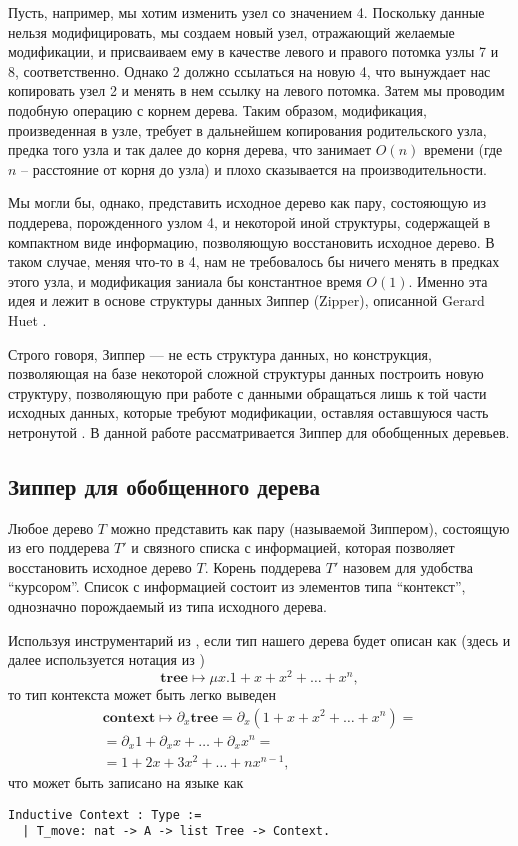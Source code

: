 Пусть, например, мы хотим изменить узел со значением 4. Поскольку данные нельзя модифицировать, мы создаем новый узел, отражающий желаемые модификации, и присваиваем ему в качестве левого и правого потомка узлы 7 и 8, соответственно. Однако 2 должно ссылаться на новую 4, что вынуждает нас копировать узел 2 и менять в нем ссылку на левого потомка. Затем мы проводим подобную операцию с корнем дерева. Таким образом, модификация, произведенная в узле, требует в дальнейшем копирования родительского узла, предка того узла и так далее до корня дерева, что занимает $O(n)$ времени (где $n$ -- расстояние от корня до узла) и плохо сказывается на производительности.

Мы могли бы, однако, представить исходное дерево как пару, состояющую из поддерева, порожденного узлом 4, и некоторой иной структуры, содержащей в компактном виде информацию, позволяющую восстановить исходное дерево. В таком случае, меняя что-то в 4, нам не требовалось бы ничего менять в предках этого узла, и модификация заниала бы константное время $O(1)$. Именно эта идея и лежит в основе структуры данных Зиппер (Zipper), описанной Gerard Huet \autocite{Huet1997}.

Строго говоря, Зиппер --- не есть структура данных, но конструкция, позволяющая на базе некоторой сложной структуры данных построить новую структуру, позволяющую при работе с данными обращаться лишь к той части исходных данных, которые требуют модификации, оставляя оставшуюся часть нетронутой \autocite{Huet1997}. В данной работе рассматривается Зиппер для обобщенных деревьев.

\subsection{Зиппер для обобщенного дерева}

Любое дерево $T$ можно представить как пару (называемой Зиппером), состоящую из его поддерева $T'$ и связного списка с информацией, которая позволяет восстановить исходное дерево $T$. Корень поддерева $T'$ назовем для удобства ``курсором''. Список с информацией состоит из элементов типа ``контекст'', однозначно порождаемый из типа исходного дерева.

Используя инструментарий из \autocite{McBride2009}, если тип нашего дерева будет описан как (здесь и далее используется нотация из \autocite{McBride2009})
\begin{equation*}
\textbf{tree} \mapsto \mu x. 1 + x + x^2 + \dotsc + x^n,
\end{equation*}   
то тип контекста может быть легко выведен
\begin{multline*}
\textbf{context} \mapsto \partial_x \textbf{tree} = \partial_x \left( 1 + x + x^2 + \dotsc + x^n \right)  = \\
= \partial_x 1 + \partial_x x + \dotsc + \partial_x x^n = \\
= 1 + 2x + 3x^2 + \dotsc + nx^{n-1},
\end{multline*}
что может быть записано на языке \tcoq как
\begin{lstlisting}
Inductive Context : Type :=
  | T_move: nat -> A -> list Tree -> Context.
\end{lstlisting}

